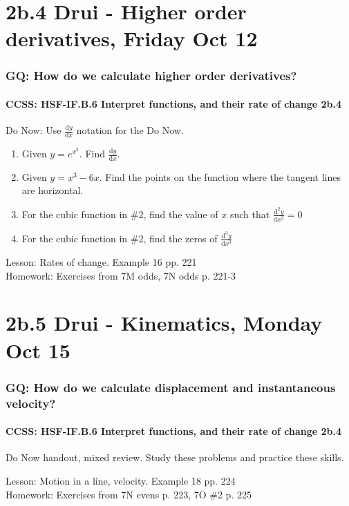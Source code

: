 \documentclass{beamer}
\begin{document}
\section{2b.4 Drui - Higher order derivatives, Friday Oct 12}
  \frame
  {
    \frametitle{GQ: How do we calculate higher order derivatives?}
    \framesubtitle{CCSS: HSF-IF.B.6 Interpret functions, and their rate of change  \alert{2b.4}}

    \begin{block}{Do Now: Use $\frac{\mathrm{d}y}{\mathrm{d}x}$ notation for the Do Now.}
      \begin{enumerate}
      \item Given $y=e^{x^2}$. Find $\frac{\mathrm{d}y}{\mathrm{d}x}$.
      \item Given $y=x^3-6x$. Find the points on the function where the tangent lines are horizontal.
      \item For the cubic function in \#2, find the value of $x$ such that $\frac{\mathrm{d}^2y}{\mathrm{d}x^2}=0$
      \item For the cubic function in \#2, find the zeros of  $\frac{\mathrm{d}^3y}{\mathrm{d}x^3}$
      \end{enumerate}
   \end{block}
    Lesson: Rates of change. Example 16 pp. 221\\
    \bigskip
    Homework: Exercises from 7M odds, 7N odds p. 221-3
  }

\section{2b.5 Drui - Kinematics, Monday Oct 15}
  \frame
  {
    \frametitle{GQ: How do we calculate displacement and instantaneous velocity?}
    \framesubtitle{CCSS: HSF-IF.B.6 Interpret functions, and their rate of change  \alert{2b.4}}

    \begin{block}{Do Now handout, mixed review.}
      Study these problems and practice these skills.
    \end{block} \bigskip
    Lesson: Motion in a line, velocity. Example 18 pp. 224\\
    \bigskip
    Homework: Exercises from 7N evens p. 223, 7O \#2 p. 225
  }
\end{document}
